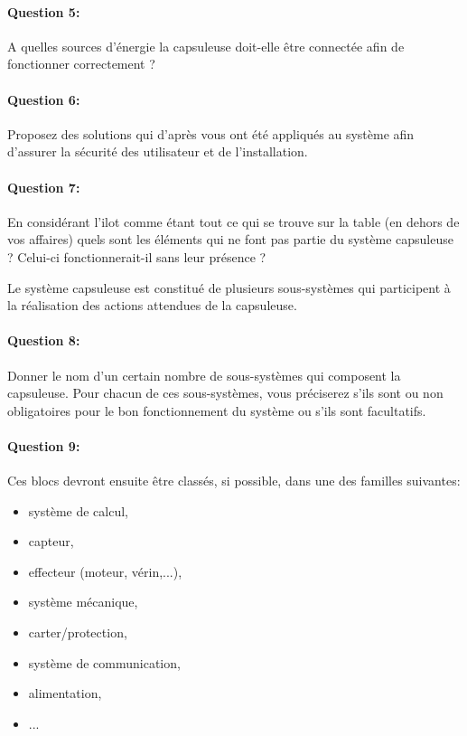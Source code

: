\paragraph{Question 5:} A quelles sources d'énergie la capsuleuse doit-elle être connectée afin de fonctionner correctement ?

\paragraph{Question 6:} Proposez des solutions qui d'après vous ont été appliqués au système afin d'assurer la sécurité des utilisateur et de l'installation.

\paragraph{Question 7:} En considérant l'ilot comme étant tout ce qui se trouve sur la table (en dehors de vos affaires) quels sont les éléments qui ne font pas partie du système capsuleuse ? Celui-ci fonctionnerait-il sans leur présence ?


Le système capsuleuse est constitué de plusieurs sous-systèmes qui participent à la réalisation des actions attendues de la capsuleuse.

\paragraph{Question 8:} Donner le nom d'un certain nombre de sous-systèmes qui composent la capsuleuse. Pour chacun de ces sous-systèmes, vous préciserez s'ils sont ou non obligatoires pour le bon fonctionnement du système ou s'ils sont facultatifs.

\paragraph{Question 9:} Ces blocs devront ensuite être classés, si possible, dans une des familles suivantes:
\begin{itemize}
 \item système de calcul,
 \item capteur,
 \item effecteur (moteur, vérin,...),
 \item système mécanique,
 \item carter/protection,
 \item système de communication,
 \item alimentation,
 \item ...
\end{itemize}

